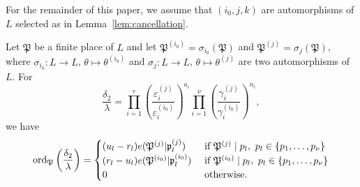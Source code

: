 For the remainder of this paper, we assume that $(i_0,j,k)$ are automorphisms of $L$ selected as in Lemma~\ref{lem:cancellation}.

\begin{lemma}\label{lem:ordpz}
Let $\mathfrak{P}$ be a finite place of $L$ and let $\mathfrak{P}^{(i_0)} = \sigma_{i_0}(\mathfrak{P})$ and $\mathfrak{P}^{(j)} = \sigma_{j}(\mathfrak{P})$, where $\sigma_{i_0}: L \to L$, $\theta \mapsto \theta^{(i_0)}$ and $\sigma_{j}: L \to L$, $\theta \mapsto \theta^{(j)}$ are two automorphisms of $L$. For 
\[\frac{\delta_2}{\lambda}= \prod_{i = 1}^{r}\left( \frac{\varepsilon_i^{(j)}}{\varepsilon_i^{(i_0)}}\right)^{a_i} \prod_{i = 1}^{\nu} \left( \frac{\gamma_i^{(j)}}{\gamma_i^{(i_0)}}\right)^{n_i},\]
we have
\[\operatorname{ord}_{\mathfrak{P}}\left(\frac{\delta_2}{\lambda}\right)=
\begin{cases}
(u_l - r_l)e(\mathfrak{P}^{(j)}|\mathfrak{p}_l^{(j)})	
	& \textnormal{ if } \mathfrak{P}^{(j)} \mid p_l , \ p_l \in \{p_1,\dots, p_{\nu}\}\\
(r_l - u_l)e(\mathfrak{P}^{(i_0)}|\mathfrak{p}_l^{(i_0)})
	& \textnormal{ if } \mathfrak{P}^{(i_0)}\mid p_l, \ p_l \in \{p_1,\dots, p_{\nu}\}\\
0 	& \textnormal{ otherwise}.
\end{cases}\]
\end{lemma}
